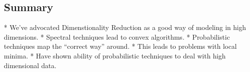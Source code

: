 
\editme

\subsection{Summary}

* We've advocated Dimenstionality Reduction as a good way of modeling in high dimensions.
* Spectral techniques lead to convex algorithms.
* Probabilistic techniques map the ``correct way'' around.
  * This leads to problems with local minima.
* Have shown ability of probabilistic techniques to deal with high dimensional data.

\endif
